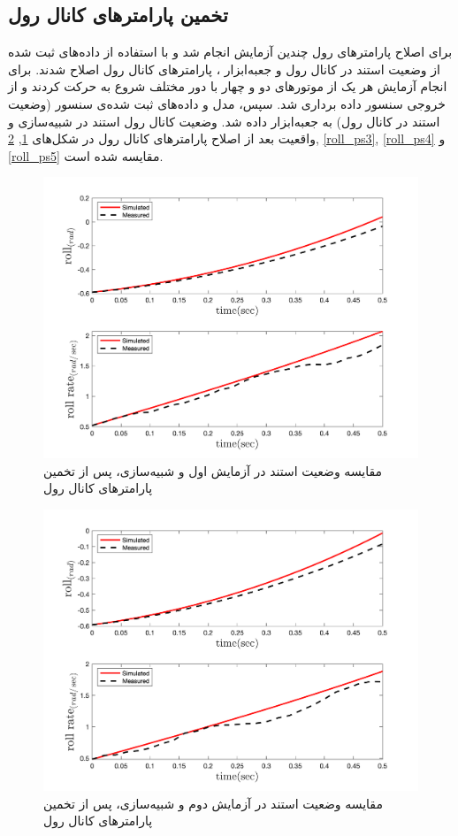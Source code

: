\subsection{تخمین پارامترهای کانال رول}
برای اصلاح پارامترهای رول چندین آزمایش انجام شد و با استفاده از داده‌های ثبت شده از وضعیت استند در کانال رول و جعبه‌ابزار
،
پارامترهای کانال رول اصلاح شدند.
برای انجام آزمایش هر یک از موتورهای دو و چهار  با دور مختلف شروع به حرکت کردند و از خروجی سنسور داده برداری شد. سپس، مدل و داده‌های ثبت شده‌ی سنسور (وضعیت استند در کانال رول) به جعبه‌ابزار
داده شد. وضعیت کانال رول استند در شبیه‌سازی و واقعیت بعد از اصلاح پارامترهای کانال رول در شکل‌های
\ref{roll_ps1}, \ref{roll_ps2}, \ref{roll_ps3}, \ref{roll_ps4} و \ref{roll_ps5}
مقایسه شده است.

\begin{figure}[H]
	\includegraphics[width=12cm]{../../Figures/RCP/roll_parameter_estimation/RCP_roll_S1.png}
	\centering
	\caption{مقايسه وضعیت استند در  آزمايش اول و شبیه‌سازی، پس از تخمین پارامترهای کانال رول}
	\label{roll_ps1}
\end{figure}
\begin{figure}[H]
	\includegraphics[width=12cm]{../../Figures/RCP/roll_parameter_estimation/RCP_roll_S2.png}
	\centering
	\caption{مقايسه وضعیت استند در  آزمايش دوم و شبیه‌سازی، پس از تخمین پارامترهای کانال رول}
	\label{roll_ps2}
\end{figure}
